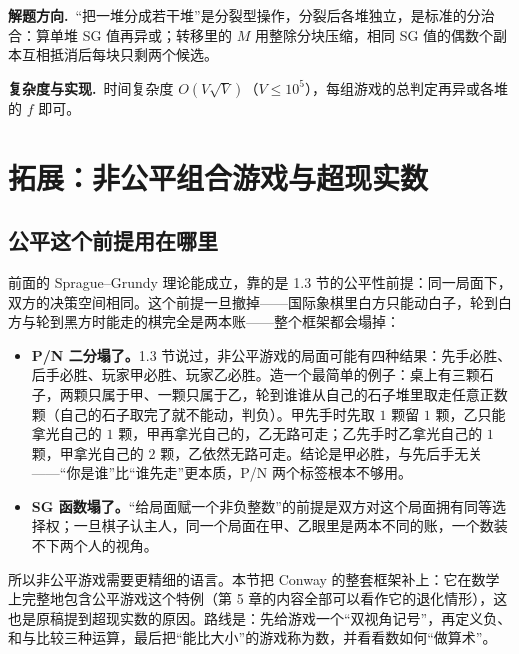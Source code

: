 \documentclass[UTF8,a4paper,11pt,oneside,openany,fontset=fandol]{ctexbook}
\theoremstyle{definition}
\newcommand{\hint}{\par\noindent\textbf{解题方向.}\ }
\newcommand{\cost}{\par\noindent\textbf{复杂度与实现.}\ }
\begin{document}
\hint “把一堆分成若干堆”是分裂型操作，分裂后各堆独立，是标准的分治合：算单堆 SG 值再异或；转移里的 $M$ 用整除分块压缩，相同 SG 值的偶数个副本互相抵消后每块只剩两个候选。

\cost 时间复杂度 $O(V\sqrt V)$（$V\le10^{5}$），每组游戏的总判定再异或各堆的 $f$ 即可。

\chapter{拓展：非公平组合游戏与超现实数}
\section{公平这个前提用在哪里}
前面的 Sprague--Grundy 理论能成立，靠的是 1.3 节的公平性前提：同一局面下，双方的决策空间相同。这个前提一旦撤掉——国际象棋里白方只能动白子，轮到白方与轮到黑方时能走的棋完全是两本账——整个框架都会塌掉：
\begin{itemize}
\item \textbf{P/N 二分塌了。}1.3 节说过，非公平游戏的局面可能有四种结果：先手必胜、后手必胜、玩家甲必胜、玩家乙必胜。造一个最简单的例子：桌上有三颗石子，两颗只属于甲、一颗只属于乙，轮到谁谁从自己的石子堆里取走任意正数颗（自己的石子取完了就不能动，判负）。甲先手时先取 $1$ 颗留 $1$ 颗，乙只能拿光自己的 $1$ 颗，甲再拿光自己的，乙无路可走；乙先手时乙拿光自己的 $1$ 颗，甲拿光自己的 $2$ 颗，乙依然无路可走。结论是甲必胜，与先后手无关——“你是谁”比“谁先走”更本质，P/N 两个标签根本不够用。
\item \textbf{SG 函数塌了。}“给局面赋一个非负整数”的前提是双方对这个局面拥有同等选择权；一旦棋子认主人，同一个局面在甲、乙眼里是两本不同的账，一个数装不下两个人的视角。
\end{itemize}
所以非公平游戏需要更精细的语言。本节把 Conway 的整套框架补上：它在数学上完整地包含公平游戏这个特例（第 5 章的内容全部可以看作它的退化情形），这也是原稿提到超现实数的原因。路线是：先给游戏一个“双视角记号”，再定义负、和与比较三种运算，最后把“能比大小”的游戏称为数，并看看数如何“做算术”。
\end{document}
